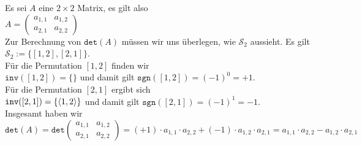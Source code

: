 \example
Es sei $A$ eine $2 \times 2$ Matrix, es gilt also
\\[0.2cm]
\hspace*{1.3cm}
$A = \left(
  \begin{array}{ll}
    a_{1,1} & a_{1,2} \\[0.2cm] 
    a_{2,1} & a_{2,2} 
  \end{array}
  \right)
$
\\[0.2cm]
Zur Berechnung von $\mathtt{det}(A)$ m\"ussen wir uns \"uberlegen, wie $\mathcal{S}_2$ aussieht.  Es gilt
\\[0.2cm]
\hspace*{1.3cm}
$\mathcal{S}_2 := \bigl\{ [1,2], [2,1] \bigr\}$.
\\[0.2cm]
F\"ur die Permutation $[1,2]$ finden wir
\\[0.2cm]
\hspace*{1.3cm}
$\mathtt{inv}([1,2]) = \{\}$ \quad und damit gilt \quad 
$\mathtt{sgn}([1,2]) = (-1)^0 = +1$.
\\[0.2cm]
F\"ur die  Permutation $[2,1]$ ergibt sich
\\[0.2cm]
\hspace*{1.3cm}
$\mathtt{inv}([2,1]) = \{ \pair(1,2) \}$ \quad und damit gilt \quad
$\mathtt{sgn}([2,1]) = (-1)^1 = -1$.
\\[0.2cm]
Insgesamt haben wir
\\[0.2cm]
\hspace*{0.5cm}
$\mathtt{det}(A) = \mathtt{det}\left(\begin{array}{ll}
    a_{1,1} & a_{1,2} \\[0.2cm] 
    a_{2,1} & a_{2,2} 
  \end{array}
  \right)
  = (+1) \cdot a_{1,1} \cdot a_{2,2} + (-1) \cdot a_{1,2} \cdot a_{2,1} 
  = a_{1,1} \cdot a_{2,2} - a_{1,2} \cdot a_{2,1} 
$
\eoxs
\pagebreak

